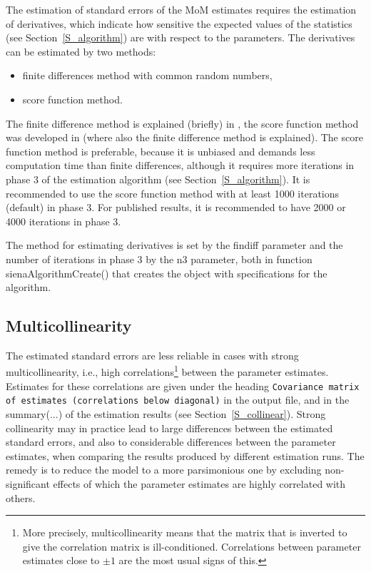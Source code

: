 \documentclass[a4paper,fleqn,11pt]{article}
\newcommand{\+}{\, + \,}
\newcommand{\sfn}[1]{\textsf{#1}}
\begin{document}
The estimation of standard errors of the MoM estimates requires
the estimation of derivatives,
which indicate how sensitive the expected values of the statistics
(see Section~\ref{S_algorithm}) are with respect to the parameters.
The derivatives can be estimated by two methods:
\begin{itemize}
\item finite differences method with common random numbers,
\item score function method.
\end{itemize}
The finite difference method is explained (briefly) in \citet{Snijders01},
the score function method was developed in \citet{SchweinbergerSnijders07a}
(where also the finite difference method is explained).
The score function method is preferable, because it is unbiased
and demands less computation time than finite differences,
although it requires more iterations in phase 3 of the estimation algorithm
(see Section~\ref{S_algorithm}).
It is recommended to use the score function method with
at least 1000 iterations (default) in phase 3.  For
published results, it is recommended to have 2000 or 4000 iterations in phase 3.

The method for estimating derivatives is set
by the \sfn{findiff} parameter and the number of iterations in phase 3
by the \sfn{n3} parameter, both in function \sfn{sienaAlgorithmCreate()}
that creates the object with specifications for the algorithm.

\subsection{Multicollinearity}

The estimated standard errors are less reliable in
cases with strong multicollinearity, i.e., high correlations\footnote{More
precisely, multicollinearity means that the matrix that is inverted
to give the correlation matrix is ill-conditioned.
Correlations between parameter estimates
close to $\pm 1$ are the most usual signs of this.} between
the parameter estimates. Estimates for these correlations
are given under the heading
\texttt{Covariance matrix of estimates (correlations below diagonal)}
in the output file, and in the \textsf{summary(...)} of the estimation results
(see Section~\ref{S_collinear}).
Strong collinearity may in practice lead to large differences
between the estimated standard errors,
and also to considerable differences between the parameter estimates,
when comparing the results produced by different estimation runs.
The remedy is to reduce the model to a more parsimonious one
by excluding non-significant effects of which the parameter
estimates are highly correlated with others.
\end{document}
